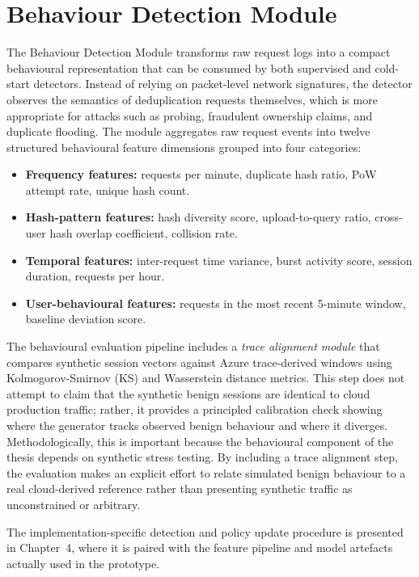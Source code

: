 \documentclass[12pt,a4paper,oneside]{report}
\begin{document}
\section{Behaviour Detection Module}

The Behaviour Detection Module transforms raw request logs into a compact behavioural representation that can be consumed by both supervised and cold-start detectors.
Instead of relying on packet-level network signatures, the detector observes the semantics of deduplication requests themselves, which is more appropriate for attacks such as probing, fraudulent ownership claims, and duplicate flooding.
The module aggregates raw request events into twelve structured behavioural feature dimensions grouped into four categories:

\begin{itemize}
  \item \textbf{Frequency features:} requests per minute, duplicate hash ratio, PoW attempt rate, unique hash count.
  \item \textbf{Hash-pattern features:} hash diversity score, upload-to-query ratio, cross-user hash overlap coefficient, collision rate.
  \item \textbf{Temporal features:} inter-request time variance, burst activity score, session duration, requests per hour.
  \item \textbf{User-behavioural features:} requests in the most recent 5-minute window, baseline deviation score.
\end{itemize}

The behavioural evaluation pipeline includes a \textit{trace alignment module} that compares synthetic session vectors against Azure trace-derived windows using Kolmogorov-Smirnov (KS) and Wasserstein distance metrics.
This step does not attempt to claim that the synthetic benign sessions are identical to cloud production traffic; rather, it provides a principled calibration check showing where the generator tracks observed benign behaviour and where it diverges.
Methodologically, this is important because the behavioural component of the thesis depends on synthetic stress testing.
By including a trace alignment step, the evaluation makes an explicit effort to relate simulated benign behaviour to a real cloud-derived reference rather than presenting synthetic traffic as unconstrained or arbitrary.

The implementation-specific detection and policy update procedure is presented in Chapter~4, where it is paired with the feature pipeline and model artefacts actually used in the prototype.
\end{document}
